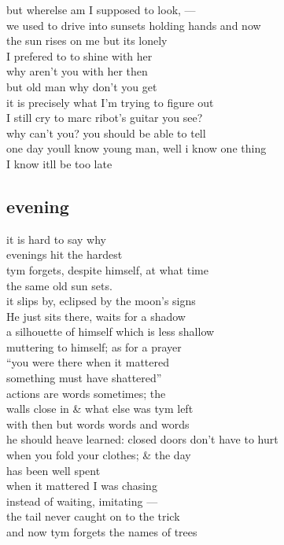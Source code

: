 \documentclass{article}
\begin{document}
but wherelse am I supposed to look, ---\\
we used to drive into sunsets holding hands and now\\
the sun rises on me but its lonely\\
I prefered to to shine with her\\
why aren't you with her then\\
but old man why don't you get\\
it is precisely what I'm trying to figure out\\
I still cry to marc ribot's guitar you see?\\
why can't you? you should be able to tell\\
one day youll know young man,
well i know one thing\\
I know itll be too late\\

\clearpage
\subsection{evening}

it is hard to say why\\
evenings hit the hardest\\
tym forgets, despite himself, at what time\\
the same old sun sets.\\
it slips by, eclipsed by the moon's signs\\
He just sits there, waits for a shadow\\
a silhouette of himself which is less shallow\\
muttering to himself; as for a prayer\\
``you were there when it mattered\\
something must have shattered''\\

actions are words sometimes; the\\
walls close in \& what else was tym left\\
with then but words words and words\\
he should heave learned: closed doors don't have to hurt\\
when you fold your clothes; \& the day\\
has been well spent\\

when it mattered I was chasing\\
instead of waiting, imitating --- \\
the tail never caught on to the trick\\
and now tym forgets the names of trees\\
\clearpage
\end{document}
